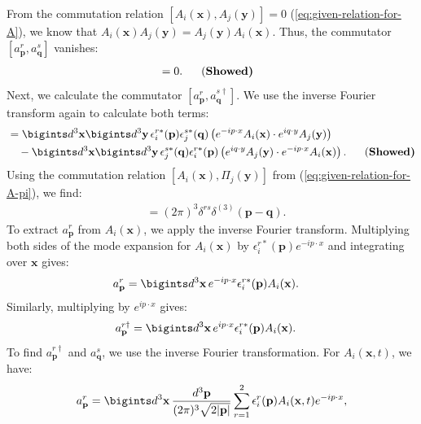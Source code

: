 \begin{enumerate}
From the commutation relation $[A_i(\mathbf{x}), A_j(\mathbf{y})] = 0$ (\ref{eq:given-relation-for-A}), we know that $A_i(\mathbf{x}) A_j(\mathbf{y}) = A_j(\mathbf{y}) A_i(\mathbf{x})$. Thus, the commutator $[a^r_{\mathbf{p}}, a^s_{\mathbf{q}}]$ vanishes:
\begin{align}
    [a^r_{\mathbf{p}}, a^s_{\mathbf{q}}] &= 0.~~~~~\text{(\bf Showed)}
\end{align}
Next, we calculate the commutator $[a^r_{\mathbf{p}}, a^{s\dagger}_{\mathbf{q}}]$. We use the inverse Fourier transform again to calculate both terms:
\begin{align}
    [a^r_{\mathbf{p}}, a^{s\dagger}_{\mathbf{q}}] &= \bigints d^3 \mathbf{x} \bigints d^3 \mathbf{y} \, \epsilon_i^{r*}(\mathbf{p}) \epsilon_j^{s*}(\mathbf{q}) \left( e^{-i p \cdot x} A_i(\mathbf{x}) \cdot e^{i q \cdot y} A_j(\mathbf{y}) \right) \nonumber \\
    &\quad - \bigints d^3 \mathbf{x} \bigints d^3 \mathbf{y} \, \epsilon_j^{s*}(\mathbf{q}) \epsilon_i^{r*}(\mathbf{p}) \left( e^{i q \cdot y} A_j(\mathbf{y}) \cdot e^{-i p \cdot x} A_i(\mathbf{x}) \right). ~~~~~\text{(\bf Showed)}
\end{align}
Using the commutation relation $[A_i(\mathbf{x}), \Pi_j(\mathbf{y})]$ from (\ref{eq:given-relation-for-A-pi}), we find:
\begin{align}
    [a^r_{\mathbf{p}}, a^{s\dagger}_{\mathbf{q}}] &= (2\pi)^3 \delta^{rs} \delta^{(3)}(\mathbf{p} - \mathbf{q}). 
\end{align}
To extract $a^r_{\mathbf{p}}$ from $A_i(\mathbf{x})$, we apply the inverse Fourier transform. Multiplying both sides of the mode expansion for $A_i(\mathbf{x})$ by $\epsilon_i^{r*}(\mathbf{p}) e^{-i p \cdot x}$ and integrating over $\mathbf{x}$ gives:
\begin{align}
    a^r_{\mathbf{p}} &= \bigints d^3 \mathbf{x} \, e^{-i p \cdot x} \epsilon_i^{r*}(\mathbf{p}) A_i(\mathbf{x}). 
\end{align}
Similarly, multiplying by $e^{i p \cdot x}$ gives:
\begin{align}
    a^{r\dagger}_{\mathbf{p}} &= \bigints d^3 \mathbf{x} \, e^{i p \cdot x} \epsilon_i^{r*}(\mathbf{p}) A_i(\mathbf{x}). 
\end{align}
To find $a^{r\dagger}_{\mathbf{p}}$ and $a^s_{\mathbf{q}}$, we use the inverse Fourier transformation. For $A_i(\mathbf{x}, t)$, we have:
\begin{align}
    a^r_{\mathbf{p}} &= \bigints d^3 \mathbf{x} \, \frac{d^3 \mathbf{p}}{(2\pi)^3 \sqrt{2|\mathbf{p}|}} \sum_{r=1}^2 \epsilon_i^r(\mathbf{p}) A_i(\mathbf{x}, t) e^{-i p \cdot x}, \\

\end{align}
\end{enumerate}
